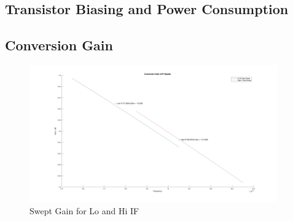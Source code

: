 \documentclass{article}                                                         %
\begin{document}
\subsection{Transistor Biasing and Power Consumption}

\subsection{Conversion Gain}
\begin{figure}[H]
  \centering
  \includegraphics[width=0.95\textwidth] {Plots/Gain.jpg}
  \caption{Swept Gain for Lo and Hi IF}
    \label{fig:matgain}
\end{figure}
\end{document}
